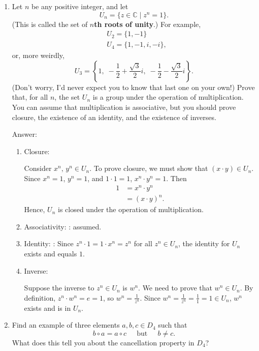 \documentclass[11pt,twoside]{article}
\begin{document}
\begin{enumerate}
\item Let $n$ be any positive integer, and let
\[U_n = \{ z \in \mathbb{C} \; | \; z^n = 1\}.\]
(This is called the set of {\bf $n$th roots of unity}.)  For example,
\begin{align*}
&U_2 = \{1,-1\}\\
&U_4 = \{1,-1,i,-i\},
\end{align*}
or, more weirdly,
\[U_3 = \left\{ 1, \; -\frac{1}{2} + \frac{\sqrt{3}}{2}i, \; -\frac{1}{2} - \frac{\sqrt{3}}{2}i\right\}.\]
(Don't worry, I'd never expect you to know that last one on your own!)  Prove that, for all $n$, the set $U_n$ is a group under the operation of multiplication.  You can assume that multiplication is associative, but you should prove closure, the existence of an identity, and the existence of inverses.

{\color{red}Answer:}
\begin{enumerate}
\item Closure: {\Large\color{grn}\checkmark}

Consider $x^n,\, y^n \in U_n$.  To prove closure, we must show that $(x\cdot y) \in U_n$.  Since $x^n = 1$, $y^n = 1$, and $1 \cdot 1 = 1$, $x^n \cdot y^n = 1$.  Then
\begin{align*}
1 &= x^n \cdot y^n\\
&= (x\cdot y)^n.
\end{align*}
Hence, $U_n$ is closed under the operation of multiplication.

\item Associativity: {\Large\color{grn}\checkmark}: assumed.
\item Identity: {\Large\color{grn}\checkmark}: Since $z^n \cdot 1 = 1 \cdot x^n = z^n$ for all $z^n \in U_n$, the identity for $U_n$ exists and equals $1$.
\item Inverse: {\Large\color{grn}\checkmark}

Suppose the inverse to $z^n \in U_n$ is $w^n$. We need to prove that $w^n \in U_n$.  By definition, $z^n \cdot w^n = e = 1$, so $w^n = \frac{1}{z^n}$.  Since $w^n = \frac{1}{z^n} = \frac{1}{1} = 1 \in U_n$, $w^n$ exists and is in $U_n$.
\end{enumerate}
\vspace{0.5cm}

\item Find an example of three elements $a,b,c \in D_4$ such that
\[b \circ a = a \circ c \;\;\;\; \text{ but } \;\;\;\; b \neq c.\]
What does this tell you about the cancellation property in $D_4$?


\end{enumerate}
\end{document}
